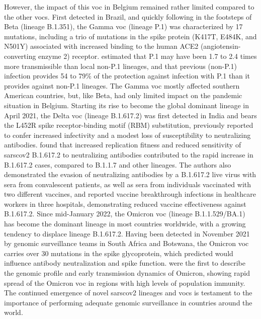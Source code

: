 However, the impact of this \gls{voc} in Belgium remained rather limited compared to the other \gls{voc}s.
First detected in Brazil, and quickly following in the footsteps of Beta (lineage B.1.351), the Gamma \gls{voc} (lineage P.1) was characterized by 17 mutations, including a trio of mutations in the spike protein (K417T, E484K, and N501Y) associated with increased binding to the human ACE2 (angiotensin-converting enzyme 2) receptor.
\citet{faria2021genomics} estimated that P.1 may have been 1.7 to 2.4 times more transmissible than local non-P.1 lineages, and that previous (non-P.1) infection provides 54 to 79\% of the protection against infection with P.1 than it provides against non-P.1 lineages.
The Gamma \gls{voc} mostly affected southern American countries, but, like Beta, had only limited impact on the pandemic situation in Belgium.
Starting its rise to become the global dominant lineage in April 2021, the Delta \gls{voc} (lineage B.1.617.2) was first detected in India and bears the L452R spike receptor-binding motif (RBM) substitution, previously reported to confer increased infectivity and a modest loss of susceptibility to neutralizing antibodies.
\citet{mlcochova2021sars-cov-2} found that increased replication fitness and reduced sensitivity of \gls{sarscov2} B.1.617.2 to neutralizing antibodies contributed to the rapid increase in B.1.617.2 cases, compared to B.1.1.7 and other lineages.
The authors also demonstrated the evasion of neutralizing antibodies by a B.1.617.2 live virus with sera from convalescent patients, as well as sera from individuals vaccinated with two different vaccines, and reported vaccine breakthrough infections in healthcare workers in three hospitals, demonstrating reduced vaccine effectiveness against B.1.617.2.
Since mid-January 2022, the Omicron \gls{voc} (lineage B.1.1.529/BA.1) has become the dominant lineage in most countries worldwide, with a growing tendency to displace lineage B.1.617.2.
Having been detected in November 2021 by genomic surveillance teams in South Africa and Botswana, the Omicron \gls{voc} carries over 30 mutations in the spike glycoprotein, which \citet{martin2022selection} predicted would influence antibody neutralization and spike function.
\citet{viana2022rapid} were the first to describe the genomic profile and early transmission dynamics of Omicron, showing rapid spread of the Omicron \gls{voc} in regions with high levels of population immunity.
The continued emergence of novel \gls{sarscov2} lineages and \gls{voc}s is testament to the importance of performing adequate genomic surveillance in countries around the world.
